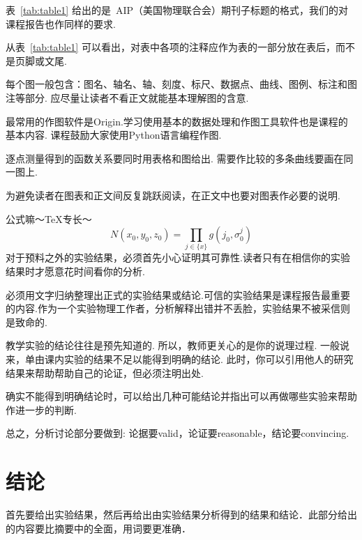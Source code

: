\documentclass[aps,pre,12pt,preprint,onecolumn,showpacs,showkeys]{revtex4-1}
\begin{document}
表~\ref{tab:table1} 给出的是~AIP（美国物理联合会）期刊子标题的格式，我们的对课程报告也作同样的要求.\par
从表~\ref{tab:table1} 可以看出，对表中各项的注释应作为表的一部分放在表后，而不是页脚或文尾.\par
每个图一般包含：图名、轴名、轴、刻度、标尺、数据点、曲线、图例、标注和图注等部分. 应尽量让读者不看正文就能基本理解图的含意.\par
最常用的作图软件是Origin.学习使用基本的数据处理和作图工具软件也是课程的基本内容. 课程鼓励大家使用Python语言编程作图.\par
逐点测量得到的函数关系要同时用表格和图给出. 需要作比较的多条曲线要画在同一图上.\par
为避免读者在图表和正文间反复跳跃阅读，在正文中也要对图表作必要的说明.\par
公式嘛～TeX专长～
\begin{equation}
N(x_0,y_0,z_0)=\prod_{j\in\{x\}}g(j_0,\sigma^j_0) \label{eq:1}
\end{equation}
对于预料之外的实验结果，必须首先小心证明其可靠性.读者只有在相信你的实验结果时才愿意花时间看你的分析.\par
必须用文字归纳整理出正式的实验结果或结论.可信的实验结果是课程报告最重要的内容.作为一个实验物理工作者，分析解释出错并不丢脸，实验结果不被采信则是致命的.\par
教学实验的结论往往是预先知道的. 所以，教师更关心的是你的说理过程. 一般说来，单由课内实验的结果不足以能得到明确的结论. 此时，你可以引用他人的研究结果来帮助帮助自己的论证，但必须注明出处. \par
确实不能得到明确结论时，可以给出几种可能结论并指出可以再做哪些实验来帮助作进一步的判断.\par
总之，分析讨论部分要做到: 论据要valid，论证要reasonable，结论要convincing.\par

\section{结论}
首先要给出实验结果，然后再给出由实验结果分析得到的结果和结论．此部分给出的内容要比摘要中的全面，用词要更准确．\par
\end{document}
